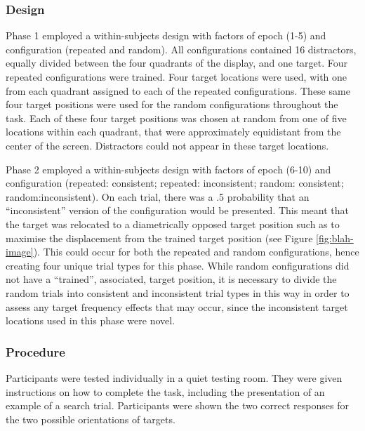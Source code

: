 \documentclass[
  man,floatsintext]{apa7}
\begin{document}
\hypertarget{design}{%
\subsubsection{Design}\label{design}}

Phase 1 employed a within-subjects design with factors of epoch (1-5) and configuration (repeated and random). All configurations contained 16 distractors, equally divided between the four quadrants of the display, and one target. Four repeated configurations were trained. Four target locations were used, with one from each quadrant assigned to each of the repeated configurations. These same four target positions were used for the random configurations throughout the task. Each of these four target positions was chosen at random from one of five locations within each quadrant, that were approximately equidistant from the center of the screen. Distractors could not appear in these target locations.

Phase 2 employed a within-subjects design with factors of epoch (6-10) and configuration (repeated: consistent; repeated: inconsistent; random: consistent; random:inconsistent). On each trial, there was a .5 probability that an ``inconsistent'' version of the configuration would be presented. This meant that the target was relocated to a diametrically opposed target position such as to maximise the displacement from the trained target position (see Figure \ref{fig:blah-image}). This could occur for both the repeated and random configurations, hence creating four unique trial types for this phase. While random configurations did not have a ``trained'', associated, target position, it is necessary to divide the random trials into consistent and inconsistent trial types in this way in order to assess any target frequency effects that may occur, since the inconsistent target locations used in this phase were novel.



\hypertarget{procedure}{%
\subsubsection{Procedure}\label{procedure}}

Participants were tested individually in a quiet testing room. They were given instructions on how to complete the task, including the presentation of an example of a search trial. Participants were shown the two correct responses for the two possible orientations of targets.
\end{document}
